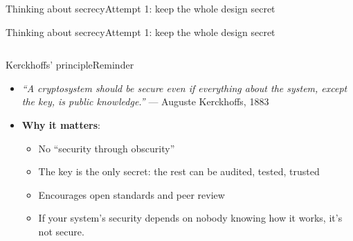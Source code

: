\ifdefined\PRESENTATION\else\PassOptionsToClass{handout}{beamer}\fi\documentclass[aspectratio=169, lualatex]{beamer}
\begin{document}
\begin{frame}{Thinking about secrecy}{Attempt 1: keep the whole design secret}
\end{frame}

\begin{frame}{Thinking about secrecy}{Attempt 1: keep the whole design secret}
	\begin{columns}[c]
	\end{columns}
\end{frame}

\begin{frame}{Kerckhoffs' principle}{Reminder}
	\begin{itemize}[<+->]
		\item \textit{``A cryptosystem should be secure even if everything about the system, except the key, is public knowledge.''} --- Auguste Kerckhoffs, 1883
		\item \textbf{Why it matters}:
		      \begin{itemize}[<+->]
			      \item No ``security through obscurity''
			      \item The key is the only secret: the rest can be audited, tested, trusted
			      \item Encourages open standards and peer review
			      \item If your system's security depends on nobody knowing how it works, it's not secure.
		      \end{itemize}
	\end{itemize}
\end{frame}
\end{document}
